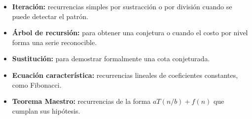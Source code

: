 \documentclass{article}
\begin{document}
        \begin{itemize}
        \item \textbf{Iteración:} recurrencias simples por sustracción o por división
                cuando se puede detectar el patrón.
        \item \textbf{Árbol de recursión:} para obtener una conjetura o cuando el
                costo por nivel forma una serie reconocible.
        \item \textbf{Sustitución:} para demostrar formalmente una cota conjeturada.
        \item \textbf{Ecuación característica:} recurrencias lineales de coeficientes
                constantes, como Fibonacci.
        \item \textbf{Teorema Maestro:} recurrencias de la forma $aT(n/b) + f(n)$ que
                cumplan sus hipótesis.
        \end{itemize}


    

	
    
%
%
%
			
\end{document}
